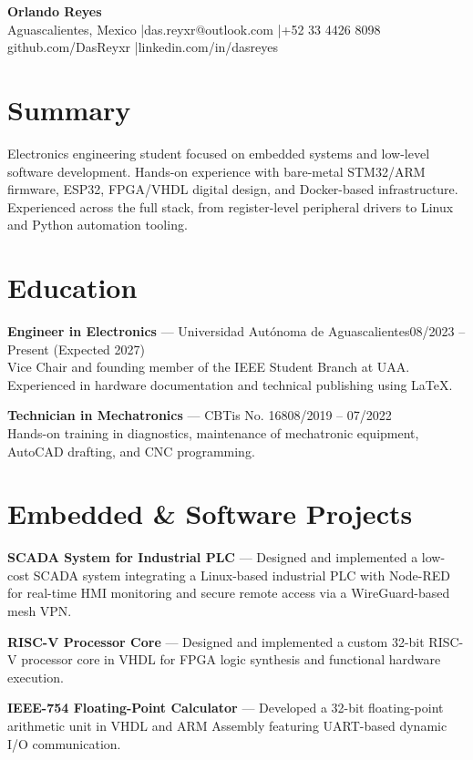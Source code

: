 \documentclass[10.5pt,a4paper]{article}
\begin{document}
\begin{center}
	{\LARGE \textbf{Orlando Reyes}}\\[0.3em]
	Aguascalientes, Mexico \quad|\quad das.reyxr@outlook.com \quad|\quad +52 33 4426 8098\\
	github.com/DasReyxr \quad|\quad linkedin.com/in/dasreyes
\end{center}

\section*{Summary}
Electronics engineering student focused on embedded systems and low-level software development. Hands-on experience with bare-metal STM32/ARM firmware, ESP32, FPGA/VHDL digital design, and Docker-based infrastructure. Experienced across the full stack, from register-level peripheral drivers to Linux and Python automation tooling.

\section*{Education}

\textbf{Engineer in Electronics} --- Universidad Aut\'onoma de Aguascalientes\hfill 08/2023 -- Present (Expected 2027)\\
Vice Chair and founding member of the IEEE Student Branch at UAA. Experienced in hardware documentation and technical publishing using LaTeX.

\vspace{0.2em}
\textbf{Technician in Mechatronics} --- CBTis No. 168\hfill 08/2019 -- 07/2022\\
Hands-on training in diagnostics, maintenance of mechatronic equipment, AutoCAD drafting, and CNC programming.

\section*{Embedded \& Software Projects}
\textbf{SCADA System for Industrial PLC} --- Designed and implemented a low-cost SCADA system integrating a Linux-based industrial PLC with Node-RED for real-time HMI monitoring and secure remote access via a WireGuard-based mesh VPN.

\textbf{RISC-V Processor Core} --- Designed and implemented a custom 32-bit RISC-V processor core in VHDL for FPGA logic synthesis and functional hardware execution.

\vspace{0.15em}
\textbf{IEEE-754 Floating-Point Calculator} --- Developed a 32-bit floating-point arithmetic unit in VHDL and ARM Assembly featuring UART-based dynamic I/O communication.
\end{document}
